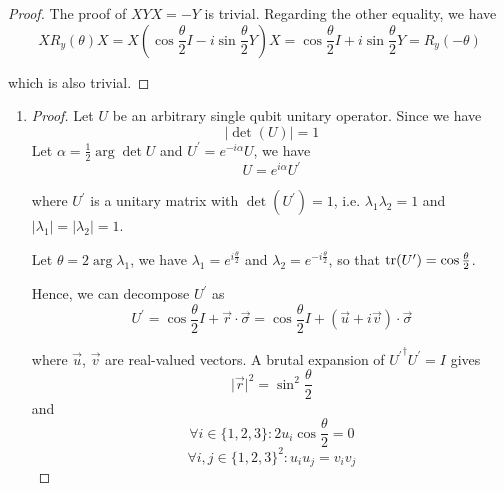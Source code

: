 \documentclass[../main.tex]{subfiles}
\begin{document}
\bigskip
\begin{exercise}
\end{exercise}
\begin{proof}
The proof of $X Y X=-Y$ is trivial. Regarding the other equality, we have
\begin{equation*}
    X R_y(\theta) X = X (\cos\frac{\theta}{2}I - i\sin{\frac{\theta}{2}}Y) X = \cos\frac{\theta}{2}I + i\sin{\frac{\theta}{2}}Y = R_y(-\theta)
\end{equation*}

which is also trivial.
\end{proof}

\bigskip
\begin{exercise}
\end{exercise}
\begin{enumerate}
    \item 
    \begin{proof}
    Let $U$ be an arbitrary single qubit unitary operator. Since we have
    \begin{equation*}
        \lvert\det(U)\rvert=1
    \end{equation*}
    Let $\alpha=\frac{1}{2}\arg\det U$ and $U^\prime=e^{-i\alpha}U$, we have
    \begin{equation*}
        U=e^{i\alpha}U^\prime
    \end{equation*}
    
    where $U^\prime$ is a unitary matrix with $\det(U^\prime)=1$, i.e. $\lambda_1\lambda_2=1$ and $\lvert\lambda_1\rvert=\lvert\lambda_2\rvert=1$. 
    
    Let $\theta=2\arg\lambda_1$, we have $\lambda_1=e^{i\frac{\theta}{2}}$ and $\lambda_2=e^{-i\frac{\theta}{2}}$, so that $\mathrm{tr}(U^\prime)=\cos\frac{\theta}{2}$.
    
    Hence, we can decompose $U^\prime$ as
    \begin{equation*}
        U^\prime=\cos\frac{\theta}{2}I+\vec{r}\cdot\vec{\sigma}=\cos\frac{\theta}{2}I+(\Vec{u}+i\Vec{v})\cdot\vec{\sigma}
    \end{equation*}
    
    where $\vec{u}$, $\vec{v}$ are real-valued vectors. A brutal expansion of ${U^\prime}^\dagger U^\prime=I$ gives 
    \begin{equation*}
        \lvert\vec{r}\rvert^2=\sin^2\frac{\theta}{2}
    \end{equation*}
    and 
    \begin{equation*}
        \forall i\in\{1,2,3\}:2u_i\cos\frac{\theta}{2}=0
    \end{equation*}
    \begin{equation*}
        \forall i,j\in\{1,2,3\}^2:u_i u_j = v_i v_j
    \end{equation*}
    

\end{proof}
\end{enumerate}
\end{document}
